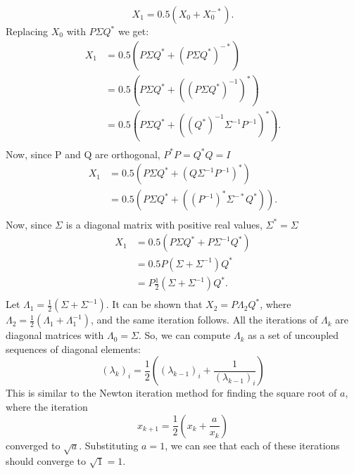\documentclass{article}
\begin{document}
\[X_{1} = 0.5 (X_{0} + X_{0}^{-*}).\]
Replacing $X_{0}$ with $P\Sigma Q^*$ we get:
\begin{align*}
    X_{1} &= 0.5 ( P\Sigma Q^* + (P\Sigma Q^*)^{-*} )\\
    &= 0.5 ( P\Sigma Q^* + ((P\Sigma Q^*)^{-1})^{*} )\\
    &= 0.5 ( P\Sigma Q^* + ((Q^*)^{-1} \Sigma^{-1} P^{-1})^{*} ).\\
\end{align*}
Now, since P and Q are orthogonal, $P^* P = Q^* Q = I$
\begin{align*}
    X_{1} &= 0.5 ( P\Sigma Q^* + (Q \Sigma^{-1} P^{-1})^{*} )\\
    &= 0.5 ( P\Sigma Q^* + ((P^{-1})^{*}  \Sigma^{-*} Q^*)).\\
\end{align*}
Now, since $\Sigma$ is a diagonal matrix with positive real values, $\Sigma^{*} = \Sigma$
\begin{align*}
    X_{1} &= 0.5 ( P\Sigma Q^* + P \Sigma^{-1} Q^*)\\
    &= 0.5 P (\Sigma + \Sigma^{-1}) Q^*\\
    &= P \frac{1}{2} (\Sigma + \Sigma^{-1}) Q^*.\\
\end{align*}
Let $\Lambda_{1} = \frac{1}{2} (\Sigma + \Sigma^{-1})$. 
It can be shown that $X_{2} = P \Lambda_{2} Q^*$, where $\Lambda_{2} = \frac{1}{2} (\Lambda_{1} + \Lambda_{1}^{-1})$, and the same iteration follows. All the iterations of $\Lambda_{k}$ are diagonal matrices with $\Lambda_0 = \Sigma$.
So, we can compute $\Lambda_{k}$ as a set of uncoupled sequences of diagonal elements: 
\[(\lambda_{k})_i = \frac{1}{2}((\lambda_{k-1})_i + \frac{1}{(\lambda_{k-1})_i})\]
This is similar to the Newton iteration method for finding the square root of $a$, where the iteration
\[ x_{k+1} = \frac{1}{2} (x_{k} + \frac{a}{x_{k}}) \]
converged to $\sqrt{a}$.
Substituting $a = 1$, we can see that each of these iterations should converge to $\sqrt{1} = 1$.

\newpage
\end{document}
